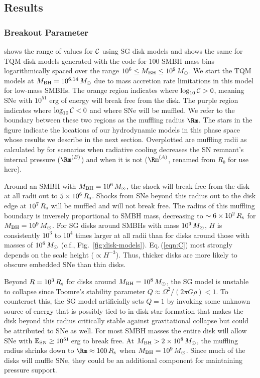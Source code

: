 
\subsection{Results} \label{sec:results-snhydro}

\subsubsection{Breakout Parameter}
 shows the range of values for $\mathcal{C}$ using SG disk models and  shows the same for TQM disk models generated with the  code for 100 SMBH mass bins logarithmically spaced over the range $10^6 \leq M_{\rm BH} \leq 10^9\,M_{\odot}$.
We start the TQM models at $M_{\rm BH}=10^{6.14}\,M_{\odot}$ due to mass accretion rate limitations in this model for low-mass SMBHs.
The orange region indicates where $\log_{10}\mathcal{C}>0$, meaning SNe with $10^{51}$ erg of energy will break free from the disk.
The purple region indicates where $\log_{10}\mathcal{C}<0$ and where SNe will be muffled.
We refer to the boundary between these two regions as the muffling radius $\Rm$.
The stars in the figure indicate the locations of our hydrodynamic models in this phase space whose results we describe in the next section.
Overplotted are muffling radii as calculated by \citet{Moranchel+21} for scenarios when radiative cooling decreases the SN remnant's internal pressure ($\Rm^{(B)}$) and when it is not ($\Rm^{(A)}$, renamed from $R_b$ for use here).

Around an SMBH with $M_{\rm BH}=10^6\,M_{\odot}$, the shock will break free from the disk at all radii out to $5\times10^6\,R_{\rm s}$.
Shocks from SNe beyond this radius out to the disk edge at $10^7\,R_{\rm s}$ will be muffled and will not break free.
The radius of this muffling boundary is inversely proportional to SMBH mass, decreasing to $\sim 6\times10^2\,R_{\rm s}$ for $M_{\rm BH}=10^9\,M_{\odot}$.
For SG disks around SMBHs with mass $10^9\,M_{\odot}$, $H$ is consistently $10^3$ to $10^4$ times larger at all radii than for disks around those with masses of $10^6\,M_{\odot}$ (c.f., Fig.~\ref{fig:disk-models}).
Eq.\,(\ref{eqn:C}) most strongly depends on the scale height ($\propto H^{-3}$).
Thus, thicker disks are more likely to obscure embedded SNe than thin disks.

Beyond $R=10^3\,R_{\rm s}$ for disks around $M_{\rm BH}=10^8\,M_{\odot}$, the SG model is unstable to collapse since Toomre's stability parameter $Q\approx\Omega^2/(2\pi G\rho) < 1$.
To counteract this, the SG model artificially sets $Q=1$ by invoking some unknown source of energy that is possibly tied to in-disk star formation that makes the disk beyond this radius critically stable against gravitational collapse but could be attributed to SNe as well.
For most SMBH masses the entire disk will allow SNe with $\mathbb{E}_{\rm SN}\geq10^{51}$\,erg to break free.
At $M_{\rm BH}> 2\times10^8\,M_{\odot}$, the muffling radius shrinks down to $\Rm\approx100\,\Rs$ when $M_{\rm BH}=10^9\,M_{\odot}$.
Since much of the disks will muffle SNe, they could be an additional component for maintaining pressure support.


